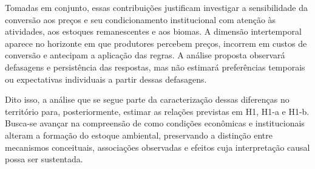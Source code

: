 Tomadas em conjunto, essas contribuições justificam investigar a sensibilidade da conversão aos preços e seu condicionamento institucional com atenção às atividades, aos estoques remanescentes e aos biomas. A dimensão intertemporal aparece no horizonte em que produtores percebem preços, incorrem em custos de conversão e antecipam a aplicação das regras. A análise proposta observará defasagens e persistência das respostas, mas não estimará preferências temporais ou expectativas individuais a partir dessas defasagens.

Dito isso, a análise que se segue parte da caracterização dessas diferenças no território para, posteriormente, estimar as relações previstas em H1, H1-a e H1-b. Busca-se avançar na compreensão de como condições econômicas e institucionais alteram a formação do estoque ambiental, preservando a distinção entre mecanismos conceituais, associações observadas e efeitos cuja interpretação causal possa ser sustentada.

